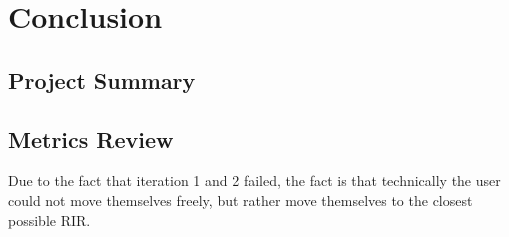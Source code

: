 \documentclass[../../main.tex]{subfiles}
\begin{document}
	\section{Conclusion}
	




	\subsection{Project Summary}


	\subsection{Metrics Review}

	Due to the fact that iteration 1 and 2 failed, the fact is that technically the user could not move themselves freely, but rather move themselves to the closest possible \ac{RIR}.
\end{document}
